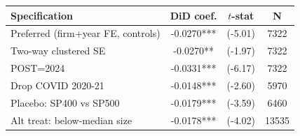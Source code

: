 \begin{tabular}{lccc}
\toprule
Specification & DiD coef. & $t$-stat & N \\
\midrule
Preferred (firm+year FE, controls) & -0.0270*** & (-5.01) & 7322 \\
Two-way clustered SE & -0.0270** & (-1.97) & 7322 \\
POST=2024 & -0.0331*** & (-6.17) & 7322 \\
Drop COVID 2020-21 & -0.0148*** & (-2.60) & 5970 \\
Placebo: SP400 vs SP500 & -0.0179*** & (-3.59) & 6460 \\
Alt treat: below-median size & -0.0178*** & (-4.02) & 13535 \\
\bottomrule
\end{tabular}